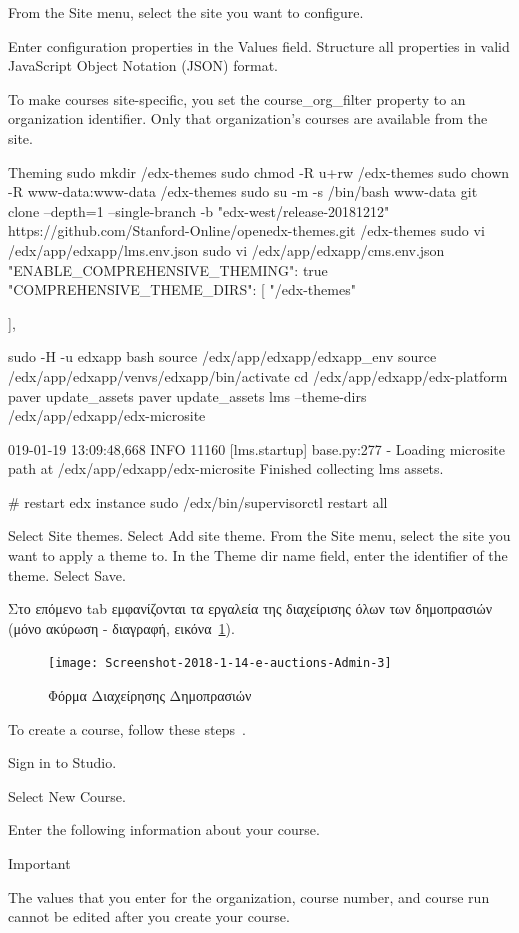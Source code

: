 \documentclass[12pt]{report}
\begin{document}
    From the Site menu, select the site you want to configure.

    Enter configuration properties in the Values field. Structure all properties in valid JavaScript Object Notation (JSON) format.

    To make courses site-specific, you set the course_org_filter property to an organization identifier. Only that organization’s courses are available from the site.

Theming
sudo mkdir /edx-themes
sudo chmod -R u+rw /edx-themes
sudo chown -R www-data:www-data /edx-themes
  sudo su -m -s /bin/bash www-data
    git clone --depth=1 --single-branch -b "edx-west/release-20181212" https://github.com/Stanford-Online/openedx-themes.git /edx-themes
  sudo vi /edx/app/edxapp/lms.env.json
  sudo vi /edx/app/edxapp/cms.env.json
  "ENABLE_COMPREHENSIVE_THEMING": true
  "COMPREHENSIVE_THEME_DIRS": [
    "/edx-themes"

],

sudo -H -u edxapp bash
source /edx/app/edxapp/edxapp_env
source /edx/app/edxapp/venvs/edxapp/bin/activate
cd /edx/app/edxapp/edx-platform
paver update_assets
paver update_assets lms --theme-dirs /edx/app/edxapp/edx-microsite

019-01-19 13:09:48,668 INFO 11160 [lms.startup] base.py:277 - Loading microsite path at /edx/app/edxapp/edx-microsite
                Finished collecting lms assets.

# restart edx instance
sudo /edx/bin/supervisorctl restart all

Select Site themes.
Select Add site theme.
From the Site menu, select the site you want to apply a theme to.
In the Theme dir name field, enter the identifier of the theme.
Select Save.

Στο επόμενο \textlatin{tab} εμφανίζονται τα εργαλεία της διαχείρισης όλων των δημοπρασιών (μόνο ακύρωση - διαγραφή, εικόνα~\ref{fig:auction_admin}).
\begin{figure}[H]
\centering
\texttt{[image: Screenshot-2018-1-14-e-auctions-Admin-3]}
\caption{Φόρμα Διαχείρησης Δημοπρασιών}
\label{fig:auction_admin}
\end{figure}
To create a course, follow these steps~\cite{edxdata_package_2}.

    Sign in to Studio.

    Select New Course.

    Enter the following information about your course.

    Important

    The values that you enter for the organization, course number, and course run cannot be edited after you create your course.
\end{document}
